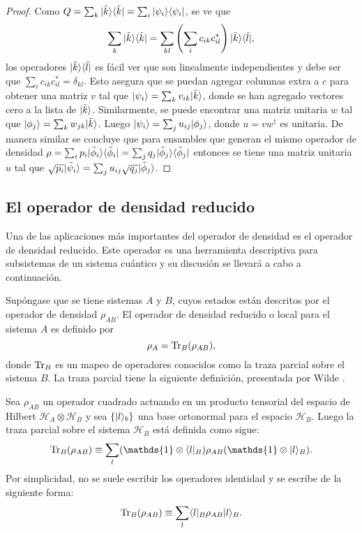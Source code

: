 \begin{proof}
Como  $Q=\sum_k  |\tilde{k}\rangle \langle \tilde{k}|=\sum_{i}|\psi_i\rangle \langle\psi_i|$, se ve
que \[\sum_k |\tilde{k}\rangle \langle \tilde{k}|=\sum_{kl} \left(\sum_i
c_{ik}c_{il}^{*}\right)|\tilde{k}\rangle \langle \tilde{l}|,\] los operadores $|\tilde{k}
\rangle \langle \tilde{l}|$ es fácil ver  que son linealmente independientes y debe ser
que $\sum_i c_{ik}c_{il}^{*}=\delta_{kl}$. Esto asegura que se puedan agregar
columnas extra a $c$ para obtener una matriz $v$ tal que
$|\psi_i\rangle=\sum_{k}v_{ik}|\tilde{k}\rangle  $, donde se han agregado  vectores cero a la
lista de $|\tilde{k}\rangle$. Similarmente, se puede encontrar una matriz unitaria
$w$ tal que $|\phi_j\rangle=\sum_{k}w_{jk}|\tilde{k}\rangle$. Luego $|\psi_i\rangle=\sum_j
u_{ij}|\phi_j\rangle$, donde  $u=vw^\dagger$ es unitaria. De manera similar se concluye que para ensambles que generan el mismo operador de densidad $\rho=\sum_i p_i |\tilde{\phi}_i\rangle \langle\tilde{\phi}_i|= \sum_j q_j|\tilde{\phi}_j \rangle \langle\tilde{\phi}_j| $ entonces se tiene una matriz unitaria $u$ tal que  $\sqrt{p_i}|\tilde{\psi}_i\rangle=\sum_{j} u_{ij} \sqrt{q_j}|\tilde{\phi}_j\rangle$.
\end{proof}

\subsection{El operador de densidad reducido} %

Una de las aplicaciones más importantes del operador de densidad es el operador
de densidad reducido. Este operador es una herramienta descriptiva para subsistemas de un
sistema cuántico y su discusión se llevará a cabo a continuación. 


Supóngase que se tiene sistemas $A$ y $B$, cuyos estados están descritos por el
operador de densidad $\rho_{AB}$. El operador de densidad reducido o local para
el sistema $A$ es definido por  
\begin{equation}
	\rho_A={\rm Tr}_B(\rho_{AB}),
\end{equation} 
donde ${\rm Tr}_B$ es un mapeo de operadores conocidos como la traza parcial sobre
el sistema $B$. La traza parcial tiene la siguiente definición, presentada
por Wilde {\cite{wilde2011classical}}.

\begin{definition}
Sea  $ \rho_{AB}$ un operador cuadrado actuando en un producto tensorial del
espacio de Hilbert $\mathcal{H}_A \otimes \mathcal{ H}_B$ y sea $\{|l\rangle_b\}$
una base ortonormal para el espacio $\mathcal{H}_B$. Luego la traza parcial
sobre el sistema $\mathcal{H}_B$ está definida como sigue: 
\begin{equation}
		\tr_B(\rho_{AB})\equiv\sum_{l} (\mathds{1}\otimes\la l|_B)\rho_{AB}(\mathds{1}\otimes|l\ra_B).	
\end{equation} 
Por simplicidad, no se suele escribir los operadores identidad y se escribe de la siguiente forma:
\begin{equation}
	{\rm Tr}_B(\rho_{AB})\equiv\sum_{l} \langle l|_B\rho_{AB}|l\rangle_B.
\end{equation}
\end{definition}

